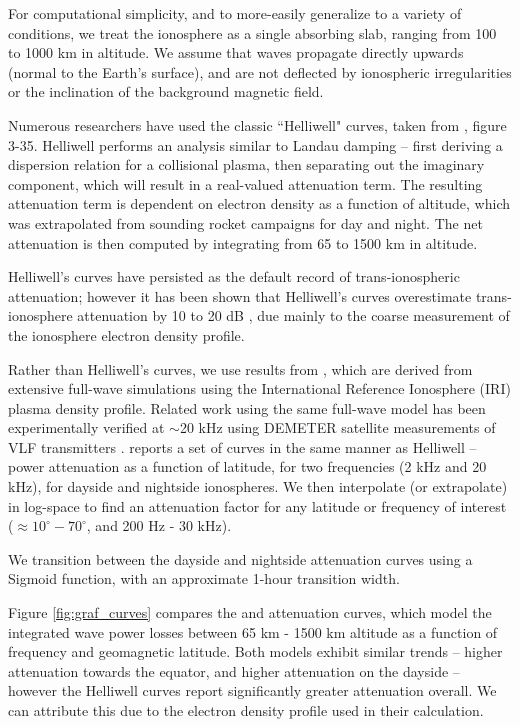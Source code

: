 For computational simplicity, and to more-easily generalize to a variety of conditions, we treat the ionosphere as a single absorbing slab, ranging from 100 to 1000 km in altitude. We assume that waves propagate directly upwards (normal to the Earth's surface), and are not deflected by ionospheric irregularities or the inclination of the background magnetic field.

Numerous researchers \citep{Lauben1998, Bortnik2005, Kulkarni2009, Graf2013} have used the classic ``Helliwell" curves, taken from \cite{Helliwell1965}, figure 3-35. Helliwell performs an analysis similar to Landau damping -- first deriving a dispersion relation for a collisional plasma, then separating out the imaginary component, which will result in a real-valued attenuation term. The resulting attenuation term is dependent on electron density as a function of altitude, which was extrapolated from sounding rocket campaigns for day and night. The net attenuation is then computed by integrating from 65 to 1500 km in altitude.

Helliwell's curves have persisted as the default record of trans-ionospheric attenuation; however it has been shown that Helliwell's curves overestimate trans-ionosphere attenuation by 10 to 20 dB \citep{Starks2008}, due mainly to the coarse measurement of the ionosphere electron density profile.

Rather than Helliwell's curves, we use results from \cite{Graf2013}, which are derived from extensive full-wave simulations using the International Reference Ionosphere (IRI) plasma density profile. Related work using the same full-wave model has been experimentally verified at $\sim$20 kHz using DEMETER satellite measurements of VLF transmitters \citep{Cohen2012}. \citeauthor{Graf2013} reports a set of curves in the same manner as Helliwell -- power attenuation as a function of latitude, for two frequencies (2 kHz and 20 kHz), for dayside and nightside ionospheres. We then interpolate (or extrapolate) in log-space to find an attenuation factor for any latitude or frequency of interest ($\approx 10^\circ - 70^\circ$, and 200 Hz - 30 kHz).

We transition between the dayside and nightside attenuation curves using a Sigmoid function, with an approximate 1-hour transition width.

Figure \ref{fig:graf_curves} compares the \cite{Graf2013} and \cite{Helliwell1965} attenuation curves, which model the integrated wave power losses between 65 km - 1500 km altitude as a function of frequency and geomagnetic latitude. Both models exhibit similar trends -- higher attenuation towards the equator, and higher attenuation on the dayside -- however the Helliwell curves report significantly greater attenuation overall. We can attribute this due to the electron density profile used in their calculation.

